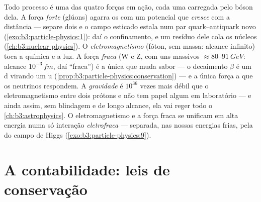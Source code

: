 \begin{remark}\label{rem:b3:particle-physics:forces}
Todo processo é uma das quatro forças em ação, cada uma carregada pelo
bóson dela. A força \emph{forte} (glúons) agarra os  com um
potencial que \emph{cresce} com a distância --- separe dois 
e o campo esticado estala num par
quark--antiquark novo (\cref{exo:b3:particle-physics:1}): daí o
confinamento, e um resíduo dele cola os núcleos
(\cref{ch:b3:nuclear-physics}). O \emph{eletromagnetismo} (fóton,
sem massa: alcance infinito) toca a química e a luz. A
força \emph{fraca} (W e Z, com uns massivos
$\approx80$--$\qty{91}{GeV}$: alcance $10^{-3}\,\unit{fm}$,
daí ``fraca'') é a única que muda sabor --- o decaimento $\beta$ é
um  d virando um u
(\cref{prop:b3:particle-physics:conservation}) --- e a única
força a que os neutrinos respondem. A \emph{gravidade} é $10^{36}$ vezes
mais débil que o eletromagnetismo entre dois prótons e não tem papel
algum em laboratório --- e ainda assim, sem blindagem e de longo alcance,
ela vai reger todo o \cref{ch:b3:astrophysics}. O eletromagnetismo e a
força fraca se unificam em alta energia numa só interação
\emph{eletrofraca} --- separada, nas nossas energias frias, pela  do campo de Higgs (\cref{exo:b3:particle-physics:9}).
\end{remark}

\section{A contabilidade: leis de conservação}


